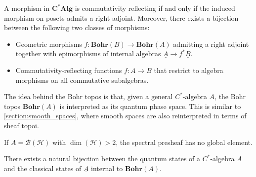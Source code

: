     \begin{property}\label{quantum:topos_morphisms}
        A morphism in $\mathbf{C^*Alg}$ is commutativity reflecting if and only if the induced morphism on posets admits a right adjoint. Moreover, there exists a bijection between the following two classes of morphisms:
        \begin{itemize}
            \item Geometric morphisms $f:\mathbf{Bohr}(B)\rightarrow\mathbf{Bohr}(A)$ admitting a right adjoint together with epimorphisms of internal algebras $\underline{A}\rightarrow f^*\underline{B}$.
            \item Commutativity-reflecting functions $f:A\rightarrow B$ that restrict to algebra morphisms on all commutative subalgebras.
        \end{itemize}
    \end{property}


    The idea behind the Bohr topos is that, given a general $C^*$-algebra $A$, the Bohr topos $\mathbf{Bohr}(A)$ is interpreted as its quantum phase space. This is similar to \cref{section:smooth_spaces}, where smooth spaces are also reinterpreted in terms of sheaf topoi.

    \begin{theorem}
        If $A=\mathcal{B}(\mathcal{H})$ with $\dim(\mathcal{H})>2$, the spectral presheaf has no global element.
    \end{theorem}

    \begin{property}
        There exists a natural bijection between the quantum states of a $C^*$-algebra $A$ and the classical states of $\underline{A}$ internal to $\mathbf{Bohr}(A)$.
    \end{property}

